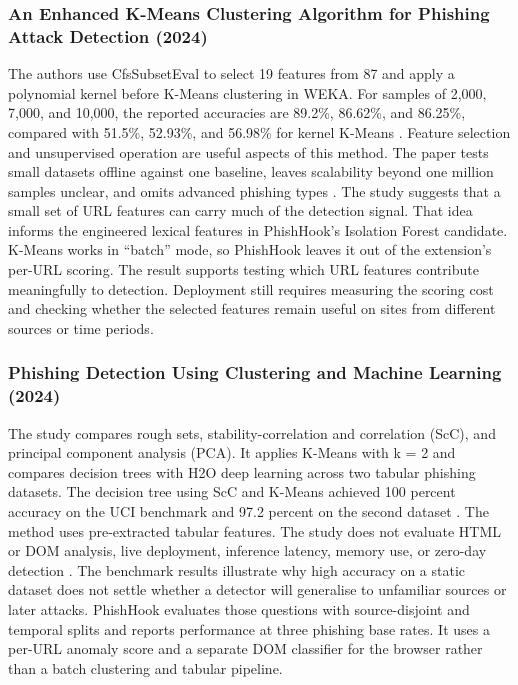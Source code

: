 \documentclass{FastFyp}
\begin{document}
\subsubsection{An Enhanced K-Means Clustering Algorithm for Phishing Attack Detection (2024)}
The authors use CfsSubsetEval to select 19 features from 87 and apply a polynomial kernel before K-Means clustering in WEKA. For samples of 2,000, 7,000, and 10,000, the reported accuracies are 89.2\%, 86.62\%, and 86.25\%, compared with 51.5\%, 52.93\%, and 56.98\% for kernel K-Means \cite{kmeans2024}. Feature selection and unsupervised operation are useful aspects of this method. The paper tests small datasets offline against one baseline, leaves scalability beyond one million samples unclear, and omits advanced phishing types \cite{kmeans2024}. The study suggests that a small set of URL features can carry much of the detection signal. That idea informs the engineered lexical features in PhishHook's Isolation Forest candidate. K-Means works in ``batch'' mode, so PhishHook leaves it out of the extension's per-URL scoring. The result supports testing which URL features contribute meaningfully to detection. Deployment still requires measuring the scoring cost and checking whether the selected features remain useful on sites from different sources or time periods.

\subsubsection{Phishing Detection Using Clustering and Machine Learning (2024)}
The study compares rough sets, stability-correlation and correlation (ScC), and principal component analysis (PCA). It applies K-Means with k = 2 and compares decision trees with H2O deep learning across two tabular phishing datasets. The decision tree using ScC and K-Means achieved 100 percent accuracy on the UCI benchmark and 97.2 percent on the second dataset \cite{clustml2024}. The method uses pre-extracted tabular features. The study does not evaluate HTML or DOM analysis, live deployment, inference latency, memory use, or zero-day detection \cite{clustml2024}. The benchmark results illustrate why high accuracy on a static dataset does not settle whether a detector will generalise to unfamiliar sources or later attacks. PhishHook evaluates those questions with source-disjoint and temporal splits and reports performance at three phishing base rates. It uses a per-URL anomaly score and a separate DOM classifier for the browser rather than a batch clustering and tabular pipeline.
\end{document}

